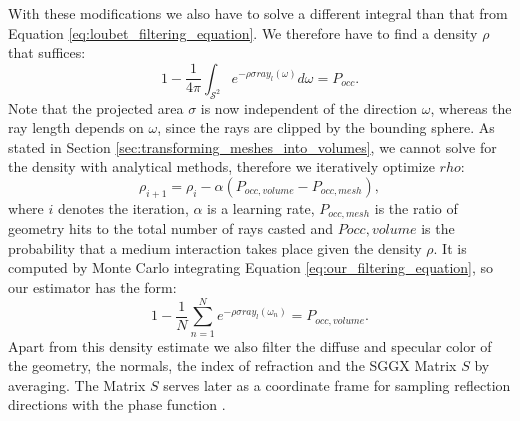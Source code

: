 With these modifications we also have to solve a different integral than that from Equation \ref{eq:loubet_filtering_equation}.
We therefore have to find a density $\rho$ that suffices:
\begin{equation}
    1 - \frac{1}{4\pi}\int_{\mathcal{S}^2} e^{-\rho\sigma ray_l(\omega)} d\omega = P_{occ}.
    \label{eq:our_filtering_equation}
\end{equation}
Note that the projected area $\sigma$ is now independent of the direction $\omega$, whereas the ray length depends on $\omega$, since the rays are clipped by the bounding sphere.
As stated in Section \ref{sec:transforming_meshes_into_volumes}, we cannot solve for the density with analytical methods, therefore we iteratively optimize $rho$:
\begin{equation*}
    \rho_{i+1}=\rho_i - \alpha (P_{occ,volume} - P_{occ,mesh}),
\end{equation*}
where $i$ denotes the iteration, $\alpha$ is a learning rate, $P_{occ,mesh}$ is the ratio of geometry hits to the total number of rays casted and $P{occ,volume}$ is the probability that a medium interaction takes place given the density $\rho$.
It is computed by Monte Carlo integrating Equation \ref{eq:our_filtering_equation}, so our estimator has the form:
\begin{equation*}
    1 - \frac{1}{N}\sum_{n=1}^{N} e^{-\rho\sigma ray_l(\omega_n)} = P_{occ,volume}.
\end{equation*}
Apart from this density estimate we also filter the diffuse and specular color of the geometry, the normals, the index of refraction and the SGGX Matrix $S$ by averaging.
The Matrix $S$ serves later as a coordinate frame for sampling reflection directions with the phase function \cite{sggx}.

